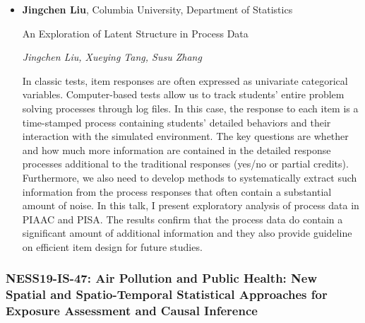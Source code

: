 \begin{itemize}
\item \textbf{Jingchen Liu}, Columbia University, Department of Statistics

An Exploration of Latent Structure in Process Data

\emph{\footnotesize Jingchen Liu, Xueying Tang, Susu Zhang}

In classic tests, item responses are often expressed as univariate categorical variables. Computer-based tests allow us to track students’ entire problem solving processes through log files. In this case, the response to each item is a time-stamped process containing students’ detailed behaviors and their interaction with the simulated environment. The key questions are whether and how much more information are contained in the detailed response processes additional to the traditional responses (yes/no or partial credits). Furthermore, we also need to develop methods to systematically extract such information from the process responses that often contain a substantial amount of noise. In this talk, I present exploratory analysis of process data in PIAAC and PISA. The results confirm that the process data do contain a significant amount of additional information and they also provide guideline on efficient item design for future studies.

\end{itemize}

\subsubsection*{NESS19-IS-47: Air Pollution and Public Health: New Spatial and Spatio-Temporal Statistical Approaches for Exposure Assessment and Causal Inference}

